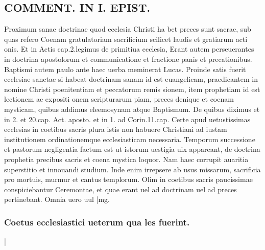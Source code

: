\documentclass{article}
\begin{document}
\begin{pages}
\section*{COMMENT. IN I. EPIST. }\pstart Proximum sanae doctrinae quod ecclesia Christi ha bet preces sunt sacrae, sub quas refero Coenam gratulatoriam sacrificium scilicet laudis et gratiarum acti onis. Et in Actis cap.2.legimus de primitiua ecclesia, Erant autem perseuerantes in doctrina apostolorum et communicatione et fractione panis et precationibus. Baptismi autem paulo ante haec uerba meminerat Lucas. Proinde satis fuerit ecclesiae sanctae si habeat doctrinam sanam id est euangelicam, praedicantem in nomine Christi poenitentiam et peccatorum remis sionem, item prophetiam id est lectionem ac expositi onem scripturarum piam, preces denique et coenam mysticam, quibus addimus eleemosynam atque Baptismum. De quibus diximus et in 2. et 20.cap. Act. aposto. et in 1. ad Corin.11.cap. Certe apud uetustissimas ecclesias in coetibus sacris plura istis non habuere Christiani ad iustam institutionem ordinationemque ecclesiasticam necessaria. Temporum successione et pastorum negligentia factum est ut istorum uestigia uix appareant, de doctrina prophetia precibus sacris et coena mystica loquor. Nam haec corrupit auaritia superstitio et innouandi studium. Inde enim irrepsere ab usus missarum, sacrificia pro mortuis, murmur et cantus templorum. Olim in coetibus sacris paucissimae conspiciebantur Ceremontae, et quae erant uel ad doctrinam uel ad preces pertinebant. Omnia uero uul\pend
|mg. \subsubsection*{Coetus ecclesiastici ueterum qua les fuerint. }|

\end{pages}
\end{document}
